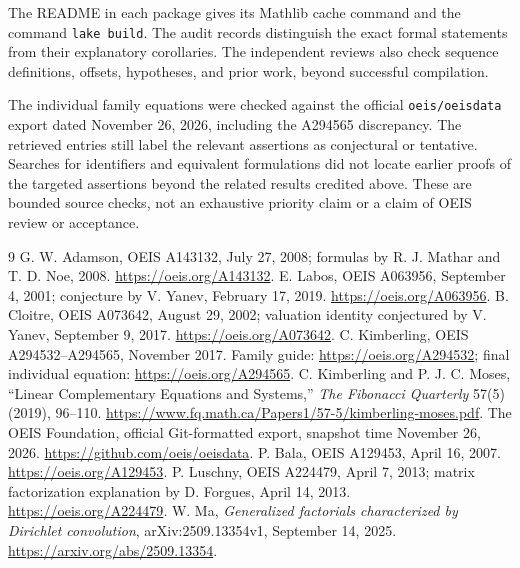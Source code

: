 \documentclass[11pt]{article}
\begin{document}
The README in each package gives its Mathlib cache command and
the command \texttt{lake build}. The audit records distinguish the exact
formal statements from their explanatory corollaries. The independent
reviews also check sequence definitions, offsets, hypotheses, and prior
work, beyond successful compilation.

The individual family equations were checked against the official
\texttt{oeis/oeisdata} export dated November 26, 2026, including the
A294565 discrepancy. The retrieved entries still label the relevant
assertions as conjectural or tentative. Searches for identifiers and
equivalent formulations did not locate earlier proofs of the targeted
assertions beyond the related results credited above. These are bounded
source checks, not an exhaustive priority claim or a claim of OEIS
review or acceptance.

\newpage
\begin{thebibliography}{9}
 G. W. Adamson, OEIS A143132, July 27, 2008;
formulas by R. J. Mathar and T. D. Noe, 2008.
\url{https://oeis.org/A143132}.
 E. Labos, OEIS A063956, September 4, 2001;
conjecture by V. Yanev, February 17, 2019.
\url{https://oeis.org/A063956}.
 B. Cloitre, OEIS A073642, August 29, 2002;
valuation identity conjectured by V. Yanev, September 9, 2017.
\url{https://oeis.org/A073642}.
 C. Kimberling, OEIS A294532--A294565, November 2017.
Family guide: \url{https://oeis.org/A294532}; final individual equation:
\url{https://oeis.org/A294565}.
 C. Kimberling and P. J. C. Moses,
``Linear Complementary Equations and Systems,''
\emph{The Fibonacci Quarterly} 57(5) (2019), 96--110.
\url{https://www.fq.math.ca/Papers1/57-5/kimberling-moses.pdf}.
 The OEIS Foundation, official Git-formatted export,
snapshot time November 26, 2026.
\url{https://github.com/oeis/oeisdata}.
 P. Bala, OEIS A129453, April 16, 2007.
\url{https://oeis.org/A129453}.
 P. Luschny, OEIS A224479, April 7, 2013;
matrix factorization explanation by D. Forgues, April 14, 2013.
\url{https://oeis.org/A224479}.
 W. Ma, \emph{Generalized factorials characterized by
Dirichlet convolution}, arXiv:2509.13354v1, September 14, 2025.
\url{https://arxiv.org/abs/2509.13354}.
\end{thebibliography}
\end{document}
